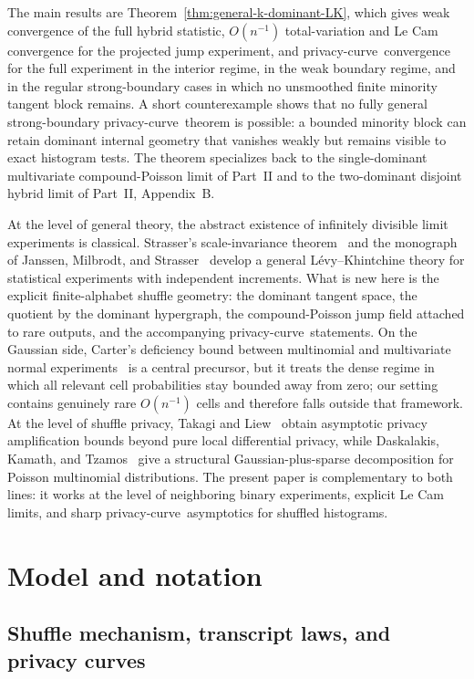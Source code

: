 \documentclass{article}
\newcommand{\1}{\mathbf 1}
\newcommand{\privacycurve}{\mbox{privacy-curve}}
\begin{document}
The main results are Theorem~\ref{thm:general-k-dominant-LK}, which gives weak convergence of the full hybrid
statistic, $O(n^{-1})$ total-variation and Le Cam convergence for the projected jump experiment, and
\privacycurve\ convergence for the full experiment in the interior regime, in the weak boundary regime, and in
the regular strong-boundary cases in which no unsmoothed finite minority tangent block remains. A short
counterexample shows that no fully general strong-boundary \privacycurve\ theorem is possible: a bounded
minority block can retain dominant internal geometry that vanishes weakly but remains visible to exact histogram
tests. The theorem specializes back to the single-dominant multivariate compound-Poisson limit of Part~II and
to the two-dominant disjoint hybrid limit of Part~II, Appendix~B.

At the level of general theory, the abstract existence of infinitely divisible limit experiments is classical.
Strasser's scale-invariance theorem~\cite{Str85} and the monograph of Janssen, Milbrodt, and Strasser~\cite{JMS85}
develop a general L\'evy--Khintchine theory for statistical experiments with independent increments. What is new
here is the explicit finite-alphabet shuffle geometry: the dominant tangent space, the quotient by the dominant
hypergraph, the compound-Poisson jump field attached to rare outputs, and the accompanying \privacycurve\
statements. On the Gaussian side, Carter's deficiency bound between multinomial and multivariate normal
experiments~\cite{Car02} is a central precursor, but it treats the dense regime in which all relevant cell
probabilities stay bounded away from zero; our setting contains genuinely rare $O(n^{-1})$ cells and therefore
falls outside that framework. At the level of shuffle privacy, Takagi and Liew~\cite{TL26} obtain asymptotic
privacy amplification bounds beyond pure local differential privacy, while Daskalakis, Kamath, and
Tzamos~\cite{DKT15} give a structural Gaussian-plus-sparse decomposition for Poisson multinomial distributions.
The present paper is complementary to both lines: it works at the level of neighboring binary experiments,
explicit Le Cam limits, and sharp \privacycurve\ asymptotics for shuffled histograms.

\section{Model and notation}

\subsection{Shuffle mechanism, transcript laws, and privacy curves}
\label{sec:model-privacy-curves}
\end{document}

